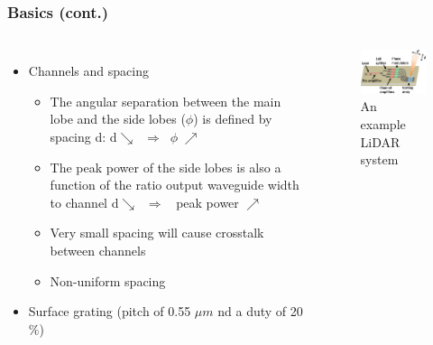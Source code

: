 \documentclass{beamer}
\begin{document}
\begin{frame}
\frametitle{Basics (cont.)}
\begin{columns}[c] %

\begin{itemize}
\item Channels and spacing
    \begin{itemize}
    \item The angular separation between the main lobe and the side lobes ($\phi$) is defined by spacing d: d$\searrow \;  \; \Rightarrow \;  \; \phi \; \nearrow$
    \item The peak power of the side lobes is also a function of the ratio output waveguide width to channel d$\searrow \;  \; \Rightarrow \;  \;$ peak power  $\nearrow$
    \item Very small spacing will cause crosstalk between channels
    \item Non-uniform spacing \cite{pic2}
    \end{itemize}
\item Surface grating (pitch of 0.55 $\mu m$ nd a duty of 20$\%$)
\end{itemize}

\begin{figure}[htbp]
    \begin{center}
    \includegraphics[width=5cm]{graphs/pic3}
    \caption{An example LiDAR system \cite{pic3}}
    \label{default}
    \end{center}
    \end{figure}

\end{columns}
\end{frame}

%
\end{document}
